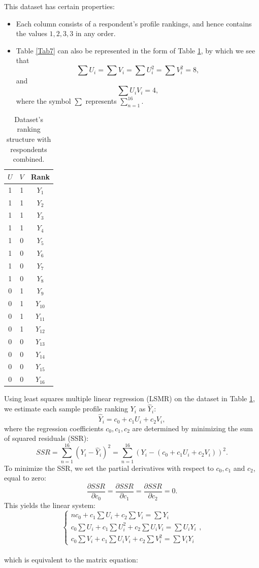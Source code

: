 \documentclass[a4paper, 12pt]{article}
\begin{document}
This dataset has certain properties: 
\begin{itemize}
\item
Each column consists of a respondent's profile rankings, and hence contains the values $1, 2, 3, 3$ in any order.

\item
Table \ref{Tab7} can also be represented in the form of Table \ref{Tab8}, by which we see that $$\sum U_i = \sum V_i = \sum U_i^2 = \sum V_i^2= 8, $$ and $$ \sum U_iV_i = 4,$$ where the symbol $\sum $ represents $\displaystyle \sum_{n=1}^{16}$.
\end{itemize}


\begin{table}[!htpb]
\centering
\small
\begin{tabular}{cc|c}
$U$ & $V$ & Rank\\ \hline 
1&	1&	$Y_1$\\
1&	1&	$Y_2$\\
1&	1&	$Y_3$\\
1&	1&	$Y_4$\\
1&	0&	$Y_5$\\
1&	0&	$Y_6$\\
1&	0&	$Y_7$\\
1&	0&	$Y_8$\\
0&	1&	$Y_9$\\
0&	1&	$Y_{10}$\\
0&	1&	$Y_{11}$\\
0&	1&	$Y_{12}$\\
0&	0&	$Y_{13}$\\
0&	0&	$Y_{14}$\\
0&	0&	$Y_{15}$\\
0&	0&	$Y_{16}$\\\hline
\end{tabular}
\caption{{\small Dataset's ranking structure with respondents combined.}}
\label{Tab8}
\end{table}
Using least squares multiple linear regression (LSMR) on the dataset in Table \ref{Tab8}, we estimate each sample profile ranking $Y_i$ as $\hat{Y}_i$:
$$
\hat{Y}_i=c_0 + c_1 U_i + c_2 V_i,  
$$
{\flushleft where} the regression coefficients $c_0,c_1,c_2$ are determined by minimizing the sum of squared residuals (SSR):
$$
SSR = \sum_{n=1}^{16}(Y_i-\hat{Y}_i)^2
=\sum_{n=1}^{16}(Y_i-(c_0 + c_1 U_i + c_2 V_i))^2.
$$
To minimize the SSR, we set the partial derivatives with respect to $c_0,c_1$ and $c_2$, equal to zero:
$$\frac{\partial SSR}{\partial c_0} = \frac{\partial SSR}{\partial c_1} = \frac{\partial SSR}{\partial c_2} = 0.$$
This yields the linear system:
$$\begin{cases}
nc_0 +  c_1\sum U_i + c_2\sum V_i = \sum Y_i\\
c_0\sum U_i + c_1\sum U_i^2 + c_2\sum U_iV_i = \sum U_iY_i\\
c_0\sum V_i + c_1\sum U_iV_i + c_2\sum V_i^2 = \sum V_iY_i
\end{cases},$$\\
which is equivalent to the matrix equation:
\end{document}
